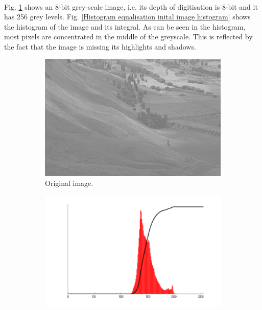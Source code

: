 \documentclass[12pt, twocolumn]{report}
\begin{document}
\paragraph{}
Fig. \ref{Histogram equalisation inital image} shows an 8-bit grey-scale image, i.e. its depth of digitisation is 8-bit and it has 256 grey levels. Fig. \ref{Histogram equalisation inital image histogram} shows the histogram of the image and its integral. As can be seen in the histogram, most pixels are concentrated in the middle of the greyscale. This is reflected by the fact that the image is missing its highlights and shadows.

\begin{figure}[htbp]
    \centering
    \begin{subfigure}{0.4\textwidth}
        \centering
        \includegraphics[width=1\textwidth]{Figures/Histogram equalisation inital image.jpg}
        \caption{Original image.}
        \label{Histogram equalisation inital image}
    \end{subfigure}
    \begin{subfigure}{0.4\textwidth}
        \centering
        \includegraphics[width=1\textwidth]{Figures/Histogram equalisation inital image histogram.png}

\end{subfigure}
\end{figure}
\end{document}
